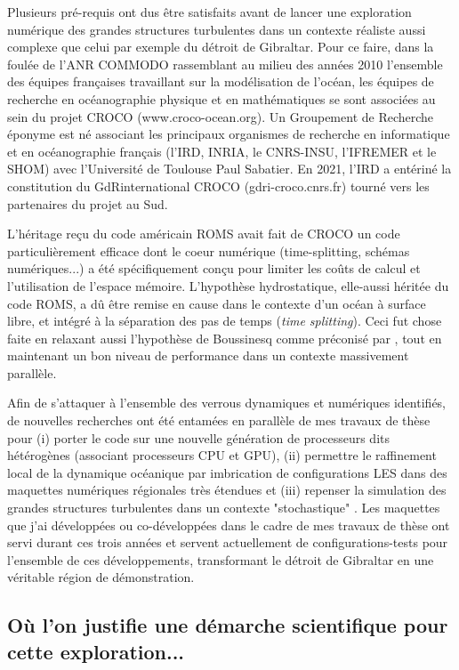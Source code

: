 Plusieurs pré-requis ont dus être satisfaits avant de lancer une exploration numérique des grandes structures turbulentes dans un contexte réaliste aussi complexe que celui par exemple du détroit de Gibraltar.
Pour ce faire, dans la foulée de l’ANR COMMODO rassemblant au milieu des années 2010 l’ensemble des équipes françaises travaillant sur la modélisation de l’océan, les équipes de recherche en océanographie physique et en mathématiques se sont associées au sein du projet CROCO (www.croco-ocean.org). Un Groupement de Recherche éponyme est né associant les principaux organismes de recherche en informatique et en océanographie français (l’IRD, INRIA, le CNRS-INSU, l’IFREMER et le SHOM) avec l'Université de Toulouse Paul Sabatier. En 2021, l’IRD a entériné la constitution du GdRinternational CROCO (gdri-croco.cnrs.fr) tourné vers les partenaires du projet au Sud. 

L'héritage reçu du code américain ROMS \citep{shchepetkin_regional_2005} avait fait de CROCO un code particulièrement efficace dont le coeur numérique (time-splitting, schémas numériques...) a été spécifiquement conçu pour limiter les coûts de calcul et l'utilisation de l'espace mémoire. L'hypothèse hydrostatique, elle-aussi héritée du code ROMS, a dû être remise en cause dans le contexte d'un océan à surface libre, et intégré à la séparation des pas de temps (\textit{time splitting}). Ceci fut chose faite en relaxant aussi l'hypothèse de Boussinesq comme préconisé par \cite{Auclair2018}, tout en maintenant un bon niveau de performance dans un contexte massivement parallèle.

Afin de s'attaquer à l'ensemble des verrous dynamiques et numériques identifiés, de nouvelles recherches ont été entamées en parallèle de mes travaux de thèse pour (i) porter le code sur une nouvelle génération de processeurs dits hétérogènes (associant processeurs CPU et GPU), (ii) permettre le raffinement local de la dynamique océanique par imbrication de configurations LES dans des maquettes numériques régionales très étendues et (iii) repenser la simulation des grandes structures turbulentes dans un contexte "stochastique" \cite{memin_fluid_2014}. Les maquettes que j'ai développées ou co-développées dans le cadre de mes travaux de thèse ont servi durant ces trois années et servent actuellement de configurations-tests pour l'ensemble de ces développements, transformant le détroit de Gibraltar en une véritable région de démonstration.

\subsection{Où l'on justifie une démarche scientifique pour cette exploration...}

